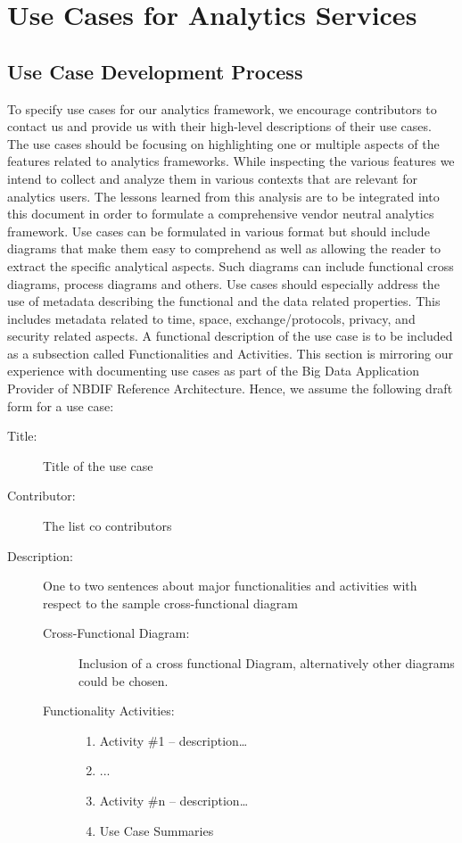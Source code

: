 
\section{Use Cases for Analytics Services}
\label{sec:usecases}


\subsection{Use Case Development Process}

To specify use cases for our analytics framework, we encourage contributors to contact us and provide us with their high-level descriptions of their use cases. The use cases should be focusing on highlighting one or multiple aspects of the features related to analytics frameworks. While inspecting the various features we intend to collect and analyze them in various contexts that are relevant for analytics users. The lessons learned from this analysis are to be integrated into this document in order to formulate a comprehensive vendor neutral analytics framework.
Use cases can be formulated in various format but should include diagrams that make them easy to comprehend as well as allowing the reader to extract the specific analytical aspects. Such diagrams can include functional cross diagrams, process diagrams and others.
Use cases should especially address the use of metadata describing the functional and the data related properties. This includes metadata related to time, space, exchange/protocols, privacy, and security related aspects.
A functional description of the use case is to be included as a subsection called Functionalities and Activities. This section is mirroring our experience with documenting use cases as part of the Big Data Application Provider of NBDIF Reference Architecture. Hence, we assume the following draft form for a use case:

\begin{description}
\item[Title:] 		Title of the use case
\item[Contributor:] 	The list co contributors
\item[Description:] 	One to two sentences about major functionalities and activities with respect to the sample cross-functional diagram
	
	\begin{description}
	\item[Cross-Functional Diagram:]
		Inclusion of a cross functional Diagram, alternatively other diagrams could be 			chosen.
	\item[Functionality Activities:]
	\begin{enumerate}
        \item Activity \#1 – description…
        \item ...
        \item Activity \#n – description…
    	\item Use Case Summaries
    \end{enumerate}
\end{description}
\end{description}

